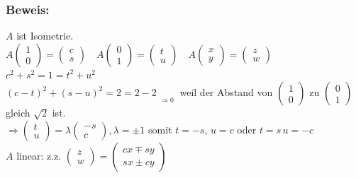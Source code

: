 \subsubsection{Beweis:}
$A$ ist Isometrie.\\
$A\begin{pmatrix} 1 \\ 0 \end{pmatrix} = \begin{pmatrix} c \\ s \end{pmatrix}  \quad A\begin{pmatrix} 0 \\ 1 \end{pmatrix} = \begin{pmatrix} t \\ u \end{pmatrix} \quad A\begin{pmatrix} x \\ y \end{pmatrix} = \begin{pmatrix} z \\ w \end{pmatrix}$\\
$ c^{2}+s^{2}=1=t^{2}+u^{2}$\\
$(c-t)^{2} + (s-u)^{2} = 2 =2-2\mathop{\underbrace{(tc+su)}}\limits_{\Rightarrow 0 }$ weil der Abstand von $\begin{pmatrix} 1 \\ 0 \end{pmatrix}$ zu $\begin{pmatrix} 0 \\ 1 \end{pmatrix}$ gleich $\sqrt{2}$ ist. \\
$\Rightarrow \begin{pmatrix} t \\ u \end{pmatrix} = \lambda \begin{pmatrix} -s \\ c \end{pmatrix}, \lambda = \pm 1$ somit $ t = -s, \, u = c$ oder $t=s \, u =-c$\\
$A$ linear: z.z. $\begin{pmatrix}z \\ w \end{pmatrix} = \begin{pmatrix} cx \mp sy \\ sx \pm cy \end{pmatrix}$\\
